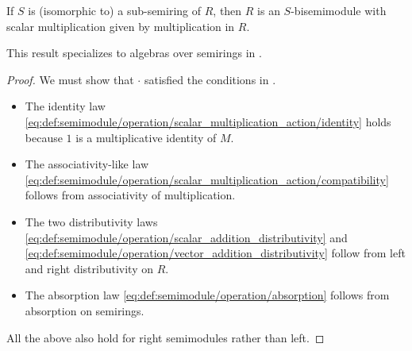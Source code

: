 \begin{proposition}\label{thm:bisemimodule_over_submonoid}
  If \( S \) is (isomorphic to) a sub-semiring of \( R \), then \( R \) is an \( S \)-bisemimodule with scalar multiplication given by multiplication in \( R \).
\end{proposition}
\begin{comments}
  \item This result specializes to algebras over semirings in .
\end{comments}
\begin{proof}
  We must show that \( \cdot \) satisfied the conditions in .
  \begin{itemize}
    \item The identity law \eqref{eq:def:semimodule/operation/scalar_multiplication_action/identity} holds because \( 1 \) is a multiplicative identity of \( M \).
    \item The associativity-like law \eqref{eq:def:semimodule/operation/scalar_multiplication_action/compatibility} follows from associativity of multiplication.
    \item The two distributivity laws \eqref{eq:def:semimodule/operation/scalar_addition_distributivity} and \eqref{eq:def:semimodule/operation/vector_addition_distributivity} follow from left and right distributivity on \( R \).
    \item The absorption law \eqref{eq:def:semimodule/operation/absorption} follows from absorption on semirings.
  \end{itemize}

  All the above also hold for right semimodules rather than left.
\end{proof}

